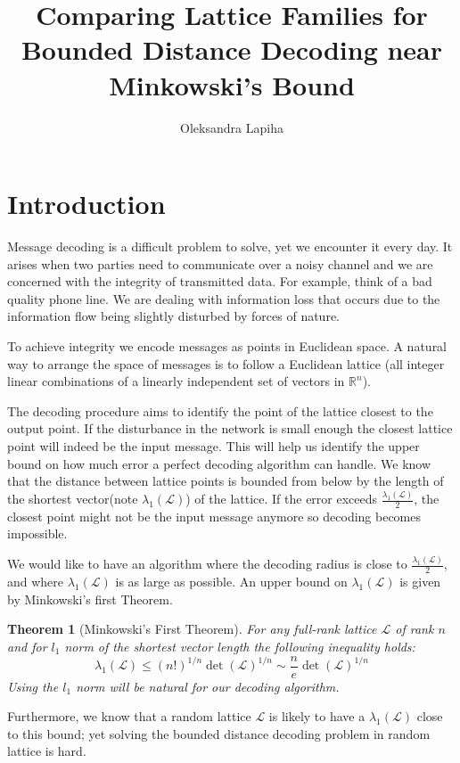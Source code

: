\documentclass[12pt]{article}
\title{Comparing Lattice Families for Bounded Distance Decoding near Minkowski’s Bound}
\author{ Oleksandra Lapiha }
\newcommand{\LL}{\mathcal{L}}
\newtheorem{theorem}{Theorem}
\begin{document}
\maketitle



\section{Introduction}
\label{sec:intro}


Message decoding is a difficult problem to solve, yet we encounter it every day. It arises when two parties need to communicate over a noisy channel and we are concerned with the integrity of transmitted data. For example, think of a bad quality phone line. We are dealing with information loss that occurs due to the information flow being slightly disturbed by forces of nature.

To achieve integrity we encode messages as points in Euclidean space.  A natural way to arrange the space of messages is to follow a Euclidean lattice (all integer linear combinations of a linearly independent set of vectors in $\mathbb{R}^{n}$).

The decoding procedure aims to identify the point of the lattice closest to the output point. If the disturbance in the network is small enough the closest lattice point will indeed be the input message. This will help us identify the upper bound on how much error a perfect decoding algorithm can handle. We know that the distance between lattice points is bounded from below by the length of the shortest vector(note $\lambda_{1}(\LL)$) of the lattice. If the error exceeds $\frac{\lambda_{1}(\LL)}{2}$, the closest point might not be the input message anymore so decoding becomes impossible.

We would like to have an algorithm where the decoding radius is close to $\frac{\lambda_{1}(\LL)}{2}$, and where $\lambda_{1}(\LL)$ is as large as possible. An upper bound on $\lambda_{1}(\LL)$ is given by Minkowski's first Theorem.

\begin{theorem}[Minkowski's First Theorem]
    For any full-rank lattice $\LL$ of rank $n$ and for $l_1$ norm of the shortest vector length the following inequality holds:
    \[
        \lambda_{1}(\LL) \leq (n!)^{1/n} \det(\LL)^{1/n} \sim \frac{n}{e} \det(\LL)^{1/n}
    \]
    Using the $l_1$ norm will be natural for our decoding algorithm.
\end{theorem}
Furthermore, we know that a random lattice $\LL$ is likely to have a $\lambda_{1}(\LL)$ close to this bound; yet solving the bounded distance decoding problem in random lattice is hard.
\end{document}
